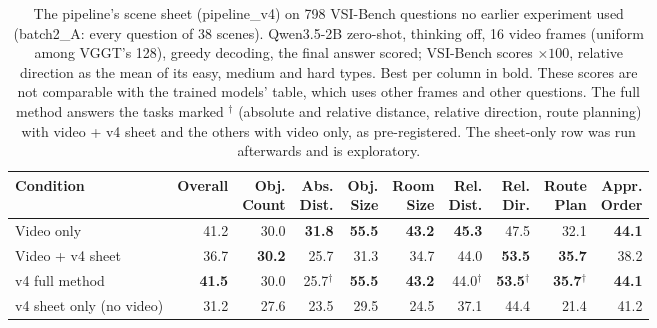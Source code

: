 \begin{table}[t]
\centering
\small
\begin{tabular}{lrrrrrrrrr}
\toprule
Condition & Overall & \shortstack[r]{Obj.\\Count} & \shortstack[r]{Abs.\\Dist.} & \shortstack[r]{Obj.\\Size} & \shortstack[r]{Room\\Size} & \shortstack[r]{Rel.\\Dist.} & \shortstack[r]{Rel.\\Dir.} & \shortstack[r]{Route\\Plan} & \shortstack[r]{Appr.\\Order} \\
\midrule
Video only & 41.2 & 30.0 & \textbf{31.8} & \textbf{55.5} & \textbf{43.2} & \textbf{45.3} & 47.5 & 32.1 & \textbf{44.1} \\
Video + v4 sheet & 36.7 & \textbf{30.2} & 25.7 & 31.3 & 34.7 & 44.0 & \textbf{53.5} & \textbf{35.7} & 38.2 \\
v4 full method & \textbf{41.5} & 30.0 & 25.7$^\dagger$ & \textbf{55.5} & \textbf{43.2} & 44.0$^\dagger$ & \textbf{53.5}$^\dagger$ & \textbf{35.7}$^\dagger$ & \textbf{44.1} \\
v4 sheet only (no video) & 31.2 & 27.6 & 23.5 & 29.5 & 24.5 & 37.1 & 44.4 & 21.4 & 41.2 \\
\bottomrule
\end{tabular}
\caption{The pipeline's scene sheet (pipeline\_v4) on 798 VSI-Bench questions no earlier experiment used (batch2\_A: every question of 38 scenes). Qwen3.5-2B zero-shot, thinking off, 16 video frames (uniform among VGGT's 128), greedy decoding, the final answer scored; VSI-Bench scores $\times 100$, relative direction as the mean of its easy, medium and hard types. Best per column in bold. These scores are not comparable with the trained models' table, which uses other frames and other questions. The full method answers the tasks marked $^\dagger$ (absolute and relative distance, relative direction, route planning) with video + v4 sheet and the others with video only, as pre-registered. The sheet-only row was run afterwards and is exploratory.}
\label{tab:pipeline-v4-batch2A}
\end{table}
